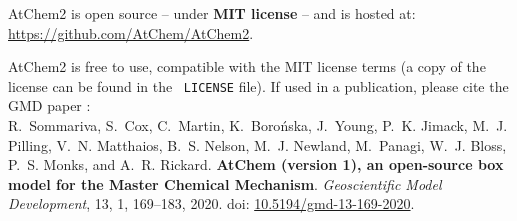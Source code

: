 AtChem2 is open source -- under \textbf{MIT license} -- and is hosted at:\\
\href{https://github.com/AtChem/AtChem2}{https://github.com/AtChem/AtChem2}.

AtChem2 is free to use, compatible with the MIT license terms (a copy
of the license can be found in the \maindir\, \texttt{LICENSE} file).
If used in a publication, please cite the GMD paper \citet{sommariva_2020}:\\

R.~Sommariva, S.~Cox, C.~Martin, K.~Boro{\'n}ska, J.~Young, P.~K. Jimack,
M.~J. Pilling, V.~N. Matthaios, B.~S. Nelson, M.~J. Newland, M.~Panagi,
W.~J. Bloss, P.~S. Monks, and A.~R. Rickard.
\textbf{AtChem (version 1), an open-source box model for the Master Chemical Mechanism}.
\textit{Geoscientific Model Development}, 13, 1, 169--183, 2020.
doi: \href{https://doi.org/10.5194/gmd-13-169-2020}{10.5194/gmd-13-169-2020}.
